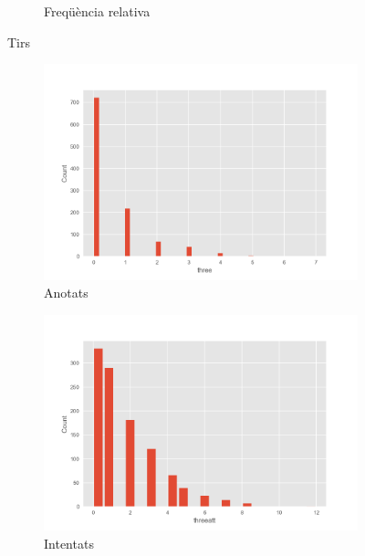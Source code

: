 \documentclass{article}
\begin{document}
\begin{figure}[!h]
\begin{subfigure}[b]{0.25\textwidth}
		\caption*{Freqüència relativa}
		\label{fig:hist9}
	\end{subfigure}
	\caption{Tirs}
	\label{fig:tirs}
\end{figure}
\begin{figure}[!h]
	\centering
	\begin{subfigure}[b]{0.25\textwidth}
		\centering
		\includegraphics[width=\textwidth]{hist10}
		\caption*{Anotats}
		\label{fig:hist10}
	\end{subfigure}
	\hfill
	\begin{subfigure}[b]{0.25\textwidth}
		\centering
		\includegraphics[width=\textwidth]{hist11}
		\caption*{Intentats}
		\label{fig:hist11}
	\end{subfigure}
	\hfill
	\begin{subfigure}[b]{0.25\textwidth}
		\centering

\end{subfigure}
\end{figure}
\end{document}
